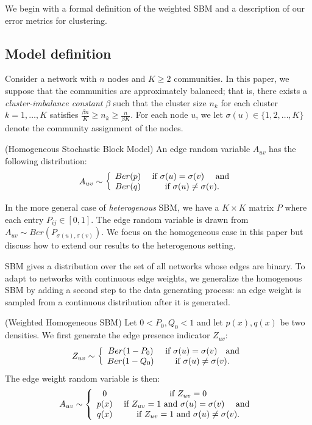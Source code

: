 \documentclass{article}
\begin{document}
We begin with a formal definition of the weighted SBM and a description of our error metrics for clustering.

\subsection{Model definition}

Consider a network with $n$ nodes and $K \geq 2$ communities. In this paper, we suppose that the communities are approximately balanced; that is, there exists a \emph{cluster-imbalance constant} $\beta$ such that the cluster size $n_k$ for each cluster $k = 1, \dots, K$ satisfies $\frac{\beta n}{K} \geq n_k \geq \frac{n}{\beta K}$. For each node $u$, we let $\sigma(u) \in \{1,2, \dots, K\}$ denote the community assignment of the nodes. 

\begin{definition} (Homogeneous Stochastic Block Model) An edge random variable $A_{uv}$ has the following distribution:
\[
A_{uv} \sim \left\{ \begin{array}{cc}
 Ber(p) & \textrm{ if } \sigma(u) = \sigma(v) \quad \text{ and } \\
 Ber(q) & \textrm{ if } \sigma(u) \neq \sigma(v). 
\end{array} \right.
\]
\end{definition}
In the more general case of \emph{heterogenous} SBM, we have a $K \times K$ matrix $P$ where each entry $P_{ij} \in [0,1]$. The edge random variable is drawn from $A_{uv} \sim Ber(P_{\sigma(u), \sigma(v)})$. We focus on the homogeneous case in this paper but discuss how to extend our results to the heterogenous setting.

SBM gives a distribution over the set of all networks whose edges are binary. To adapt to networks with continuous edge weights, we generalize the homogenous SBM by adding a second step to the data generating process: an edge weight is sampled from a continuous distribution after it is generated. 

\begin{definition}
\label{def:weighted_homo_sbm1}
(Weighted Homogeneous SBM) Let $0 < P_0, Q_0 < 1$ and let $p(x), q(x)$ be two densities. We first generate the edge presence indicator $Z_{uv}$:
\[
Z_{uv} \sim 
    \left\{ \begin{array}{cc}
    Ber(1-P_0) & \textrm{ if } \sigma(u) = \sigma(v) \quad \text{and} \\
    Ber(1-Q_0) & \textrm{ if } \sigma(u) \neq \sigma(v).
   \end{array} \right.
\]
The edge weight random variable is then:
\[
A_{uv} \sim \left\{ \begin{array}{cc} 
     0 & \textrm{ if } Z_{uv} = 0 \\
     p(x) & \textrm{ if } Z_{uv} = 1 \textrm{ and } \sigma(u) = \sigma(v) \quad \text{ and }\\
     q(x) & \textrm{ if } Z_{uv} = 1 \textrm{ and } \sigma(u) \neq \sigma(v). 
\end{array} \right.
\]
\end{definition}
\end{document}
